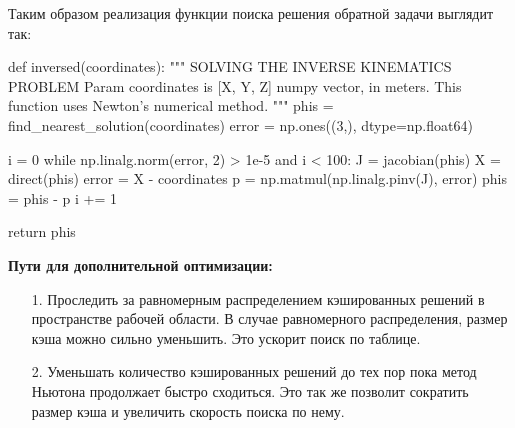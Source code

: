 \noindent Таким образом реализация функции поиска решения обратной задачи выглядит так:
\begin{python}
def inversed(coordinates):
    """ 
    SOLVING THE INVERSE KINEMATICS PROBLEM \n
    Param coordinates is [X, Y, Z] numpy vector, in meters.
    This function uses Newton's numerical method.
    """
    phis = find_nearest_solution(coordinates)
    error = np.ones((3,), dtype=np.float64)

    i = 0
    while np.linalg.norm(error, 2) > 1e-5 and i < 100:
        J = jacobian(phis)
        X = direct(phis)
        error = X - coordinates
        p = np.matmul(np.linalg.pinv(J), error)
        phis = phis - p
        i += 1
    
    return phis
\end{python}

\textbf{Пути для дополнительной оптимизации:}
\begin{itemize}
    \item[1.] Проследить за равномерным распределением кэшированных решений в пространстве рабочей области. В случае равномерного распределения, размер кэша можно сильно уменьшить. Это ускорит поиск по таблице.
    \item[2.] Уменьшать количество кэшированных решений до тех пор пока метод Ньютона продолжает быстро сходиться. Это так же позволит сократить размер кэша и увеличить скорость поиска по нему.
\end{itemize}
